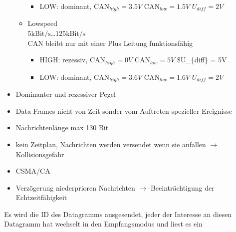 \documentclass[letterpaper,10pt,english]{jupyterBook}
\begin{document}
\begin{itemize}
\begin{itemize}
\begin{itemize}
\item {} 
\sphinxAtStartPar
LOW: dominant, CAN\(_{high} = 3.5V\) CAN\(_{low} = 1.5V\) \(U_{diff} = 2V\)

\end{itemize}

\item {} 
\sphinxAtStartPar
Lowspeed\\
\(5\text{kBit/s}\)…\(125\text{kBit/s}\)\\
CAN bleibt nur mit einer Plus Leitung funktionsfähig
\begin{itemize}
\item {} 
\sphinxAtStartPar
HIGH: rezessiv, CAN\(_{high} = 0V\) CAN\(_{low} = 5V\) \$U\_\{diff\} = 5V

\item {} 
\sphinxAtStartPar
LOW: dominant, CAN\(_{high} = 3.6V\) CAN\(_{low} = 1.6V\) \(U_{diff} = 2V\)

\end{itemize}

\end{itemize}

\item {} 
\sphinxAtStartPar
Dominanter und rezessiver Pegel

\item {} 
\sphinxAtStartPar
Data Frames nicht von Zeit sonder vom Auftreten spezieller Ereignisse

\item {} 
\sphinxAtStartPar
Nachrichtenlänge max 130 Bit

\item {} 
\sphinxAtStartPar
kein Zeitplan, Nachrichten werden versendet wenn sie anfallen \(\rightarrow\) Kollisionsgefahr

\item {} 
\sphinxAtStartPar
CSMA/CA

\item {} 
\sphinxAtStartPar
Verzögerung niederprioren Nachrichten \(\rightarrow\) Beeinträchtigung der Echtzeitfähigkeit

\end{itemize}

\begin{DUlineblock}{0em}
\item[] 
\end{DUlineblock}

\sphinxAtStartPar
Es wird die ID des Datagramms ausgesendet,
jeder der Interesse an diesen Datagramm hat wechselt in den Empfangsmodus und liest es ein
\end{document}

